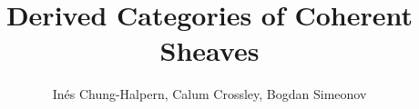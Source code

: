 \documentclass{article}
\title{Derived Categories of Coherent Sheaves}
\author{In\'es Chung-Halpern, Calum Crossley, Bogdan Simeonov}
\date{}
\begin{document}




\newpage
\sloppy
\printbibliography
\end{document}
